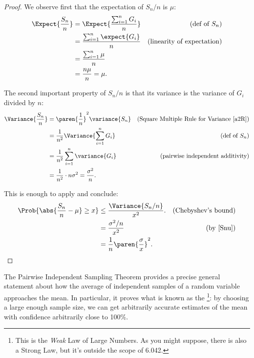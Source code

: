 \begin{proof}
We observe first that the expectation of $S_n/n$ is $\mu$:
\begin{align*}
\Expect{\frac{S_n}{n}} & = \Expect{\frac{\sum_{i=1}^n G_i}{n}}
         & \text{(def of $S_n$)}\\
 & = \frac{\sum_{i=1}^n \expect{G_i}}{n} 
     & \text{(linearity of expectation)}\\
 & = \frac{\sum_{i=1}^n \mu}{n}\\
 & = \frac{n\mu}{n} = \mu.
\end{align*}

The second important property of $S_n/n$ is that its variance is the
variance of $G_i$ divided by $n$:
\begin{align}
\Variance{\frac{S_n}{n}} & =  \paren{\frac{1}{n}}^2 \variance{S_n}
          & \mbox{(Square Multiple Rule for Variance~\eqref{a2R})}\notag\\
 & =  \frac{1}{n^2} \Variance{\sum_{i=1}^n G_i} 
          & \text{(def of $S_n$)}\notag\\
 & =  \frac{1}{n^2} \sum_{i=1}^n \variance{G_i}
        & \text{(pairwise independent additivity)}\notag\\
 & =  \frac{1}{n^2}\cdot n\sigma^2 =  \frac{\sigma^2}{n}.\label{Snu}
\end{align}

This is enough to apply  and conclude:
\begin{align*}
\Prob{\abs{\frac{S_n}{n} - \mu} \geq x} & \leq \frac{\Variance{S_n/n}}{x^2}.
       & \text{(Chebyshev's bound)}\\
    & = \frac{\sigma^2/n}{x^2} & \text{(by~\eqref{Snu})}\\
    & = \frac{1}{n} \paren{\frac{\sigma}{x}}^2.
\end{align*}

\end{proof}

The Pairwise Independent Sampling Theorem provides a precise general
statement about how the average of independent samples of a random
variable approaches the mean.  In particular, it proves what is known as
the \footnote{This is the  \emph{Weak} Law of Large Numbers.  As you might
  suppose, there is also a Strong Law, but it's outside the scope of
  6.042.}: by choosing a large enough sample size, we can get arbitrarily
accurate estimates of the mean with confidence arbitrarily close to 100\%.

